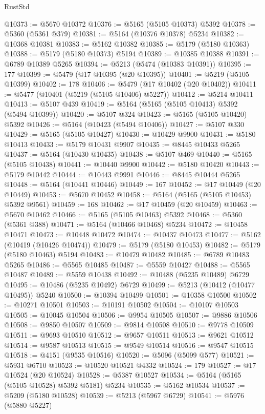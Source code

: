 \begin{lexlean}{RustStd}
\begin{coremodule}
@10373 := @5670 @10372
@10376 := @5165 (@5105 @10373) @5392
@10378 := @5360 (@5361 @379)
@10381 := @5164 (@10376 @10378) @5234
@10382 := @10368 @10381
@10383 := @5162 @10382
@10385 := @5179 (@5180 @10363)
@10388 := @5179 (@5180 @10373) @5194
@10389 := @10385 @10388
@10391 := @6789 @10389 @5265
@10394 := @5213 (@5474 (@10383 @10391))
@10395 := 177
@10399 := @5479 (@17 @10395 (@20 @10395))
@10401 := @5219 (@5105 @10399)
@10402 := 178
@10406 := @5479 (@17 @10402 (@20 @10402))
@10411 := @5477 (@10401 (@5219 (@5105 @10406) @5227))
@10412 := @5214 @10411
@10413 := @5107 @439
@10419 := @5164 (@5165 (@5105 @10413) @5392 (@5494 @10399))
@10420 := @5107 @324
@10423 := @5165 (@5105 @10420) @5392
@10426 := @5164 (@10423 (@5494 @10406))
@10427 := @5107 @330
@10429 := @5165 (@5105 @10427)
@10430 := @10429 @9900
@10431 := @5180 @10413
@10433 := @5179 @10431 @9907
@10435 := @8445 @10433 @5265
@10437 := @5164 (@10430 @10435)
@10438 := @5107 @469
@10440 := @5165 (@5105 @10438)
@10441 := @10440 @9900
@10442 := @5180 @10420
@10443 := @5179 @10442
@10444 := @10443 @9991
@10446 := @8445 @10444 @5265
@10448 := @5164 (@10441 @10446)
@10449 := 167
@10452 := @17 @10449 (@20 @10449)
@10453 := @5670 @10452
@10458 := @5164 (@5165 (@5105 @10453) @5392 @9561)
@10459 := 168
@10462 := @17 @10459 (@20 @10459)
@10463 := @5670 @10462
@10466 := @5165 (@5105 @10463) @5392
@10468 := @5360 (@5361 @388)
@10471 := @5164 (@10466 @10468) @5234
@10472 := @10458 @10471
@10473 := @10448 @10472
@10474 := @10437 @10473
@10477 := @5162 (@10419 (@10426 @10474))
@10479 := @5179 (@5180 @10453)
@10482 := @5179 (@5180 @10463) @5194
@10483 := @10479 @10482
@10485 := @6789 @10483 @5265
@10486 := @5565 @10485
@10487 := @5559 @10427
@10488 := @5565 @10487
@10489 := @5559 @10438
@10492 := @10488 (@5235 @10489) @6729
@10495 := @10486 (@5235 @10492) @6729
@10499 := @5213 (@10412 (@10477 @10495)) @5240
@10500 := @10394 @10499
@10501 := @10358 @10500
@10502 := @10271 @10501
@10503 := @10191 @10502
@10504 := @10107 @10503
@10505 := @10045 @10504
@10506 := @9954 @10505
@10507 := @9886 @10506
@10508 := @9850 @10507
@10509 := @9814 @10508
@10510 := @9778 @10509
@10511 := @9693 @10510
@10512 := @9657 @10511
@10513 := @9621 @10512
@10514 := @9587 @10513
@10515 := @9549 @10514
@10516 := @9547 @10515
@10518 := @4151 (@9535 @10516)
@10520 := @5096 (@5099 @577)
@10521 := @5931 @6710
@10523 := @10520 @10521 @4332
@10524 := 179
@10527 := @17 @10524 (@20 @10524)
@10528 := @5387 @10527
@10534 := @5164 (@5165 (@5105 @10528) @5392 @5181) @5234
@10535 := @5162 @10534
@10537 := @5209 (@5180 @10528)
@10539 := @5213 (@5967 @6729)
@10541 := @5976 (@5880 @5227)

\end{coremodule}
\end{lexlean}
